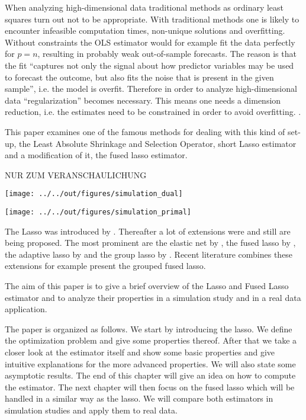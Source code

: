 \documentclass{article}
\theoremstyle{definition}
\begin{document}
When analyzing high-dimensional data traditional methods as ordinary least squares turn out not to be appropriate. With traditional methods one is likely to encounter infeasible computation times, non-unique solutions and overfitting. Without constraints the OLS estimator would for example fit the data perfectly for $p=n$, resulting in probably weak out-of-sample forecasts. The reason is that the fit “captures not only the signal about how predictor variables may be used to forecast the outcome, but also fits the noise that is present in the given sample”, i.e. the model is overfit.
Therefore in order to analyze high-dimensional data “regularization” becomes necessary. This means one needs a dimension reduction, i.e. the estimates need to be constrained in order to avoid overfitting.  \citep{belloni2014}.

This paper examines one of the famous methods for dealing with this kind of set-up, the Least Absolute Shrinkage and Selection Operator, short Lasso estimator and a modification of it, the fused lasso estimator.

NUR ZUM  VERANSCHAULICHUNG 

\texttt{[image: ../../out/figures/simulation\_dual]}

\texttt{[image: ../../out/figures/simulation\_primal]}

The Lasso was introduced by \citet{lasso}. Thereafter a lot of extensions were and still are being proposed. The most prominent are the elastic net by \citet{zou2005regularization}, the fused lasso by \citet{fused}, the adaptive lasso by \citet{zou2006adaptive} and  the group lasso by \citet{meier2008group}. Recent literature combines these extensions for example  \citet{bleakley2011group} present the grouped fused lasso.

The aim of this paper is to give a brief overview of the Lasso and Fused Lasso estimator and to analyze their properties in a simulation study and in a real data application. 

The paper is organized as follows. We start by introducing the lasso. We define the optimization problem and give some properties thereof. After that we take a closer look at the estimator itself and show some basic properties and give intuitive explanations for the more advanced properties. We will also state some asymptotic results. The end of this chapter will give an idea on how to compute the estimator. The next chapter will then focus on the fused lasso which will be handled in a similar way as the lasso. We will compare both estimators in simulation studies and apply them to real data.
\end{document}
